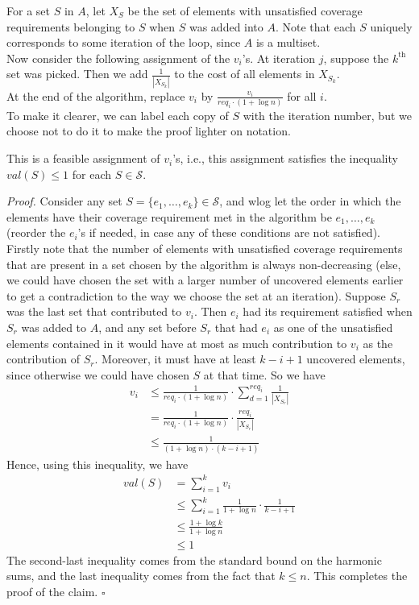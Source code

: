 \documentclass[a4paper]{article}
\newenvironment{proof}{\begin{breakbox}\textit{Proof.}}{\hfill$\square$\end{breakbox}}
\newcommand{\nl}{\vspace{0.2cm}\\}
\begin{document}
    For a set $S$ in $A$, let $X_S$ be the set of elements with unsatisfied coverage requirements belonging to $S$ when $S$ was added into $A$. Note that each $S$ uniquely corresponds to some iteration of the loop, since $A$
    is a multiset.\nl
    Now consider the following assignment of the $v_i$'s. At iteration $j$, suppose the $k^\mathrm{th}$ set was picked. Then we add $\frac{1}{|X_{S_k}|}$ to the cost of all elements in $X_{S_k}$.\nl
At the end of the algorithm, replace $v_i$ by $\frac{v_i}{req_i \cdot (1 + \log n)}$ for all $i$.\nl
    To make it clearer, we can label each copy of $S$ with the iteration number, but we choose not to do it to make the proof lighter on notation.\nl
\begin{claim}
    This is a feasible assignment of $v_i$'s, i.e., this assignment satisfies the inequality $val(S) \le 1$ for each $S \in \mathcal{S}$.
\end{claim}
\begin{proof}
    Consider any set $S = \{e_1, \ldots, e_k\} \in \mathcal{S}$, and wlog let the order in which the elements have their coverage requirement met in the algorithm be $e_1, \ldots, e_k$ (reorder the $e_i$'s
    if needed, in case any of these conditions are not satisfied).\nl
    Firstly note that the number of elements with unsatisfied coverage requirements that are present in a set chosen by the algorithm is always non-decreasing (else, we could have chosen the set with a larger number of
    uncovered elements earlier to get a contradiction to the way we choose the set at an iteration). Suppose $S_r$ was the last set that contributed to $v_i$. Then $e_i$ had its requirement satisfied when $S_r$ was added to $A$, and any
    set before $S_r$ that had $e_i$ as one of the unsatisfied elements contained in it would have at most as much contribution to $v_i$ as the contribution of $S_r$. Moreover, it must have at least
    $k - i + 1$ uncovered elements, since otherwise we could have chosen $S$ at that time. So we have\nl
    \begin{align*}
        v_i &\le \frac{1}{req_i \cdot (1 + \log n)} \cdot \sum_{d = 1}^{req_i} \frac{1}{|X_{S_r}|}\\
            &= \frac{1}{req_i \cdot (1 + \log n)} \cdot \frac{req_i}{|X_{S_r}|}\\
            &\le \frac{1}{(1 + \log n) \cdot (k - i + 1)}
    \end{align*}
    Hence, using this inequality, we have
    \begin{align*}
        val(S) &= \sum_{i = 1}^k v_i\\
               &\le \sum_{i = 1}^k \frac{1}{1 + \log n} \cdot \frac{1}{k - i + 1}\\
               &\le \frac{1 + \log k}{1 + \log n}\\
               &\le 1
    \end{align*}
    The second-last inequality comes from the standard bound on the harmonic sums, and the last inequality comes from the fact that $k \le n$.
    This completes the proof of the claim.
\end{proof}
\end{document}

